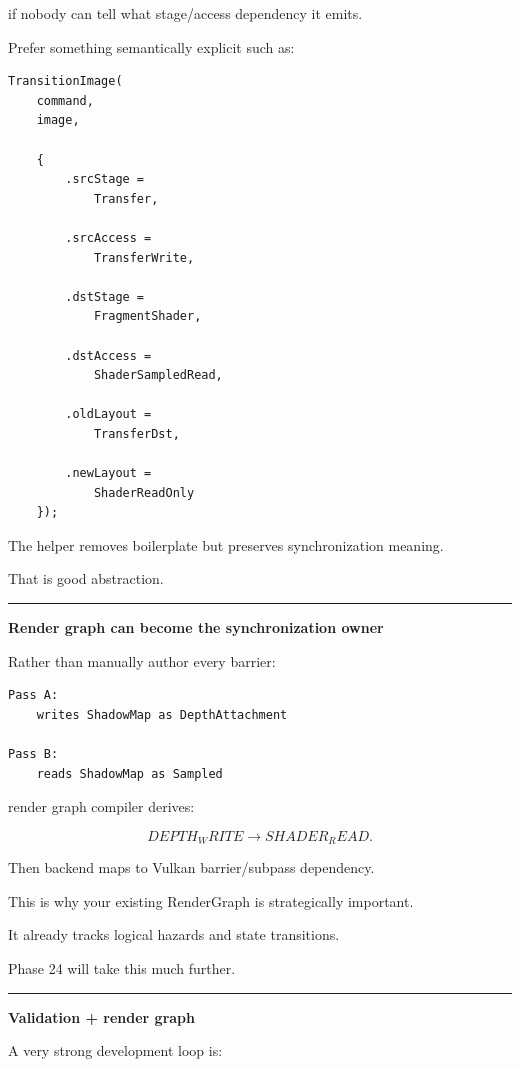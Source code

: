 if nobody can tell what stage/access dependency it emits.

Prefer something semantically explicit such as:

\begin{verbatim}
TransitionImage(
    command,
    image,

    {
        .srcStage =
            Transfer,

        .srcAccess =
            TransferWrite,

        .dstStage =
            FragmentShader,

        .dstAccess =
            ShaderSampledRead,

        .oldLayout =
            TransferDst,

        .newLayout =
            ShaderReadOnly
    });
\end{verbatim}

The helper removes boilerplate but preserves synchronization meaning.

That is good abstraction.

\begin{center}\rule{0.5\linewidth}{0.5pt}\end{center}

\textbf{Render graph can become the synchronization owner}

Rather than manually author every barrier:

\begin{verbatim}
Pass A:
    writes ShadowMap as DepthAttachment

Pass B:
    reads ShadowMap as Sampled
\end{verbatim}

render graph compiler derives:

\[
DEPTH_WRITE
\rightarrow
SHADER_READ.
\]

Then backend maps to Vulkan barrier/subpass dependency.

This is why your existing RenderGraph is strategically important.

It already tracks logical hazards and state transitions.

Phase 24 will take this much further.

\begin{center}\rule{0.5\linewidth}{0.5pt}\end{center}

\textbf{Validation + render graph}

A very strong development loop is:

